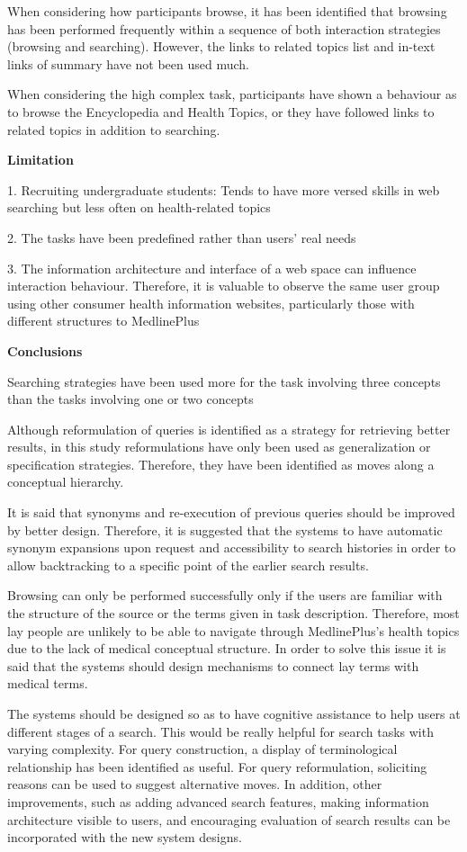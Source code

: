 \documentclass[]{article}
\begin{document}
When considering how participants browse, it has been identified that browsing has been performed frequently within  a sequence of both interaction strategies (browsing and searching). However, the links to related topics list and in-text links of summary have not been used much. 

When considering the high complex task, participants have shown a behaviour as to browse the Encyclopedia and Health Topics, or they have followed links to related topics in addition to searching.              

\textbf{Limitation}

1. Recruiting undergraduate students: Tends to have more versed skills in web searching but less often on health-related topics

2.  The tasks have been predefined rather than users’ real needs  

3. The information architecture and interface of a
web space can influence interaction behaviour. Therefore, it is valuable to observe the same user group using other consumer health information websites, particularly those with different structures to MedlinePlus

\textbf{Conclusions}

Searching strategies have been used more for the task involving three concepts than the tasks involving one or two concepts

Although reformulation of queries is identified as a strategy for retrieving better results, in this study reformulations have only been used as generalization or specification strategies. Therefore, they have been identified as moves along a conceptual hierarchy. 

It is said that synonyms and re-execution of previous queries should be improved by better design. Therefore, it is suggested that the systems to have automatic synonym expansions upon request and accessibility to search histories in order to  allow backtracking to a specific point of the earlier search results.

Browsing can only be performed successfully only if the users are familiar with the structure of the source or the terms given in task description. Therefore, most lay people are unlikely to be able to navigate through
MedlinePlus’s health topics due to the lack of medical conceptual structure. In order to solve this issue it is said that  the systems should design mechanisms to connect lay terms with medical terms.

The systems should be designed so as to have cognitive assistance to help users at different stages of a search. This would be really helpful for search tasks with varying complexity. For query construction, a display of terminological relationship has been identified as useful. For query reformulation, soliciting reasons can be used to suggest alternative moves. In addition, other improvements, such as adding advanced search features, making information architecture visible to users, and encouraging evaluation of search results can be incorporated with the new system designs. 
\end{document}
